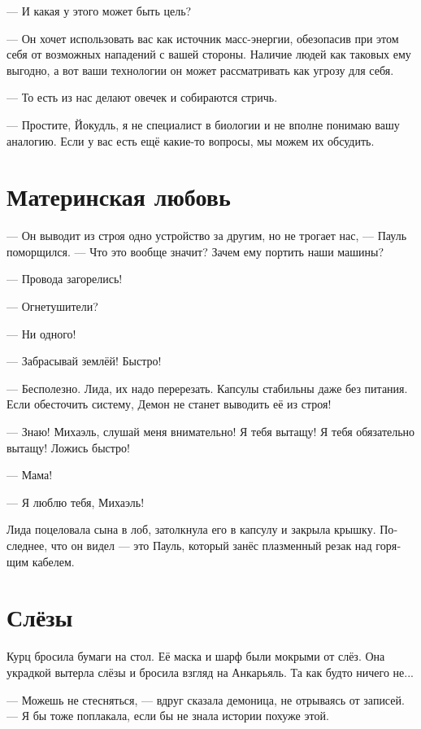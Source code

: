 \documentclass[a4paper,12pt,fleqn]{book}\usepackage{polyglossia}\setdefaultlanguage[babelshorthands=true]{russian}\setotherlanguage{english}\defaultfontfeatures{Ligatures=TeX,Mapping=tex-text}\usepackage{xcolor}\newcommand{\ml}[3]{#2}
\newcommand{\asterism}{\vspace{1em}{\centering\Large\bfseries$\ast~\ast~\ast$\par}\vspace{1em}}
\begin{document}
--- И какая у этого может быть цель?

--- Он хочет использовать вас как источник масс-энергии, обезопасив при этом себя от возможных нападений с вашей стороны.
Наличие людей как таковых ему выгодно, а вот ваши технологии он может рассматривать как угрозу для себя.

\ml{$0$}
{--- То есть из нас делают овечек и собираются стричь.}
{``So it will try to turn us into sheeps to shear.''}

\ml{$0$}
{--- Простите, Йокудль, я не специалист в биологии и не вполне понимаю вашу аналогию.}
{``I'm sorry, Jökull, I'm not an expert in biology, so I'm not sure I properly understand your analogy.}
Если у вас есть ещё какие-то вопросы, мы можем их обсудить.

\section{Материнская любовь}

--- Он выводит из строя одно устройство за другим, но не трогает нас, --- Пауль поморщился.
--- Что это вообще значит?
Зачем ему портить наши машины?

\asterism

--- Провода загорелись!

--- Огнетушители?

--- Ни одного!

--- Забрасывай землёй!
Быстро!

--- Бесполезно.
Лида, их надо перерезать.
Капсулы стабильны даже без питания.
Если обесточить систему, Демон не станет выводить её из строя!

--- Знаю!
Михаэль, слушай меня внимательно!
Я тебя вытащу!
Я тебя обязательно вытащу!
Ложись быстро!

--- Мама!

--- Я люблю тебя, Михаэль!

Лида поцеловала сына в лоб, затолкнула его в капсулу и закрыла крышку.
Последнее, что он видел --- это Пауль, который занёс плазменный резак над горящим кабелем.

\section{Слёзы}

Курц бросила бумаги на стол.
Её маска и шарф были мокрыми от слёз.
Она украдкой вытерла слёзы и бросила взгляд на Анкарьяль.
Та как будто ничего не...

--- Можешь не стесняться, --- вдруг сказала демоница, не отрываясь от записей.
--- Я бы тоже поплакала, если бы не знала истории похуже этой.
\end{document}
